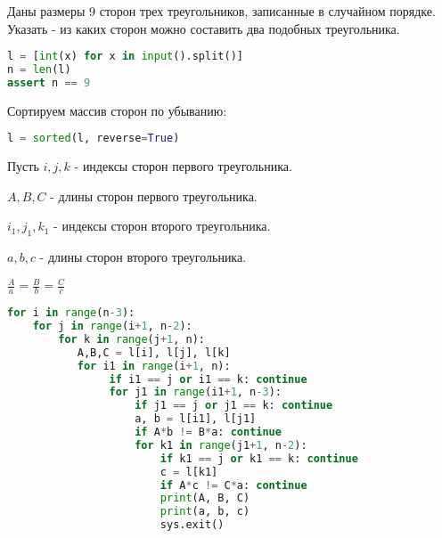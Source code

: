 \documentclass[a4paper,notitlepage,11pt]{article}
\begin{document}
Даны размеры 9 сторон трех треугольников, 
записанные в случайном порядке. Указать - из каких сторон можно составить два подобных треугольника.

\begin{lstlisting}[language=Python]
l = [int(x) for x in input().split()]
n = len(l)
assert n == 9
\end{lstlisting}

Сортируем массив сторон по убыванию:

\begin{lstlisting}[language=Python]
l = sorted(l, reverse=True)
\end{lstlisting}

Пусть $i,j,k$ - индексы сторон первого треугольника.

$A,B,C$ - длины сторон первого треугольника.

$i_1,j_1,k_1$ - индексы сторон второго треугольника.

$a,b,c$ - длины сторон второго треугольника.

$\frac{A}{a} = \frac{B}{b} = \frac{C}{c}$

\begin{lstlisting}[language=Python]
for i in range(n-3):
    for j in range(i+1, n-2):
        for k in range(j+1, n):            
           A,B,C = l[i], l[j], l[k]
           for i1 in range(i+1, n):
                if i1 == j or i1 == k: continue                
                for j1 in range(i1+1, n-3):
                    if j1 == j or j1 == k: continue
                    a, b = l[i1], l[j1]
                    if A*b != B*a: continue                   
                    for k1 in range(j1+1, n-2):
                        if k1 == j or k1 == k: continue                       
                        c = l[k1] 
                        if A*c != C*a: continue 
                        print(A, B, C) 
                        print(a, b, c) 
                        sys.exit()
\end{lstlisting}
\end{document}
